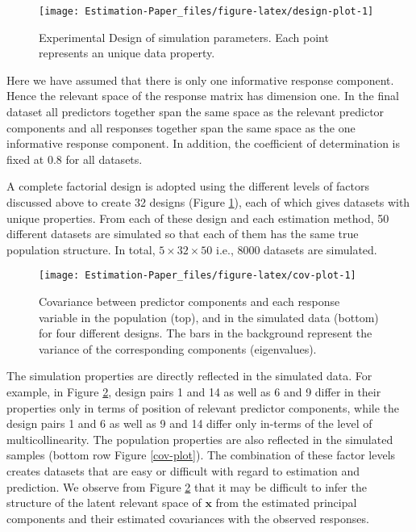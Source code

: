 \documentclass[12pt,3p,authoryear]{elsarticle}
\begin{document}
\begin{figure}
\texttt{[image: Estimation-Paper\_files/figure-latex/design-plot-1]} \caption{Experimental Design of simulation parameters. Each point represents an unique data property.}\label{fig:design-plot}
\end{figure}

Here we have assumed that there is only one informative response component. Hence the relevant space of the response matrix has dimension one. In the final dataset all predictors together span the same space as the relevant predictor components and all responses together span the same space as the one informative response component. In addition, the coefficient of determination is fixed at 0.8 for all datasets.

A complete factorial design is adopted using the different levels of factors discussed above to create 32 designs (Figure \ref{fig:design-plot}), each of which gives datasets with unique properties. From each of these design and each estimation method, 50 different datasets are simulated so that each of them has the same true population structure. In total, \(5 \times 32 \times 50\) i.e., 8000 datasets are simulated.



\begin{figure}[H]
\texttt{[image: Estimation-Paper\_files/figure-latex/cov-plot-1]} \caption{Covariance between predictor components and each response variable in the population (top), and in the simulated data (bottom) for four different designs. The bars in the background represent the variance of the corresponding components (eigenvalues).}\label{fig:cov-plot}
\end{figure}

The simulation properties are directly reflected in the simulated data. For example, in Figure \ref{fig:cov-plot}, design pairs 1 and 14 as well as 6 and 9 differ in their properties only in terms of position of relevant predictor components, while the design pairs 1 and 6 as well as 9 and 14 differ only in-terms of the level of multicollinearity. The population properties are also reflected in the simulated samples (bottom row Figure \ref{cov-plot}). The combination of these factor levels creates datasets that are easy or difficult with regard to estimation and prediction. We observe from Figure \ref{fig:cov-plot} that it may be difficult to infer the structure of the latent relevant space of \(\mathbf{x}\) from the estimated principal components and their estimated covariances with the observed responses.
\end{document}
